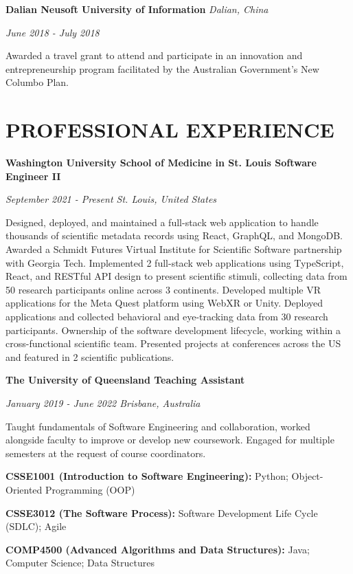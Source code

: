 \documentclass{article}
\begin{document}
  \textbf{Dalian Neusoft University of Information} \hfill \textit{Dalian, China}

  \textit{June 2018 - July 2018}

  Awarded a travel grant to attend and participate in an innovation and entrepreneurship program facilitated by the Australian Government's New Columbo Plan.

  \section*{\centering\uppercase{Professional Experience}}

  {\large\textbf{Washington University School of Medicine in St. Louis \hfill Software Engineer II}}

  \textit{September 2021 - Present \hfill St. Louis, United States}

Designed, deployed, and maintained a full-stack web application to handle thousands of scientific metadata records using React, GraphQL, and MongoDB. Awarded a Schmidt Futures Virtual Institute for Scientific Software partnership with Georgia Tech. Implemented 2 full-stack web applications using TypeScript, React, and RESTful API design to present scientific stimuli, collecting data from 50 research participants online across 3 continents. Developed multiple VR applications for the Meta Quest platform using WebXR or Unity. Deployed applications and collected behavioral and eye-tracking data from 30 research participants. Ownership of the software development lifecycle, working within a cross-functional scientific team. Presented projects at conferences across the US and featured in 2 scientific publications.

  \medbreak

  {\large\textbf{The University of Queensland \hfill Teaching Assistant}}

  \textit{January 2019 - June 2022 \hfill Brisbane, Australia}

Taught fundamentals of Software Engineering and collaboration, worked alongside faculty to improve or develop new coursework. Engaged for multiple semesters at the request of course coordinators.

  \textbf{CSSE1001 (Introduction to Software Engineering):} Python; Object-Oriented Programming (OOP)

  \textbf{CSSE3012 (The Software Process):} Software Development Life Cycle (SDLC); Agile

  \textbf{COMP4500 (Advanced Algorithms and Data Structures):} Java; Computer Science; Data Structures
\end{document}
